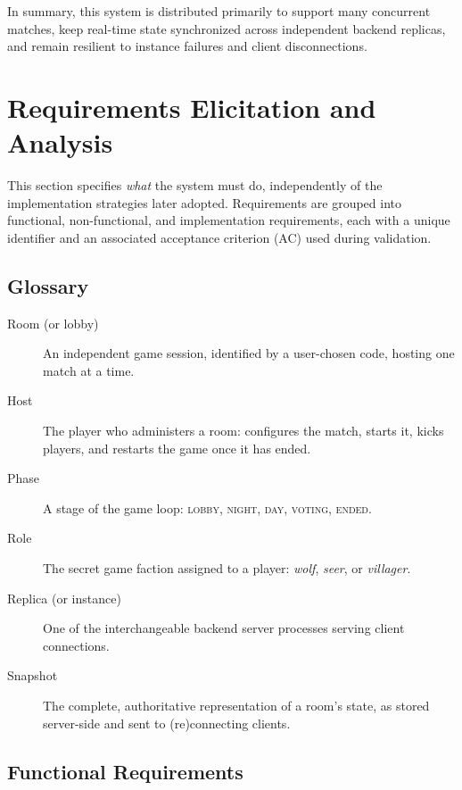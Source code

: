 \documentclass{scrartcl}
\begin{document}
In summary, this system is distributed primarily to support many concurrent
matches, keep real-time state synchronized across independent backend replicas,
and remain resilient to instance failures and client disconnections.

\section{Requirements Elicitation and Analysis}\label{requirements}

This section specifies \emph{what} the system must do, independently of the
implementation strategies later adopted. Requirements are grouped into
functional, non-functional, and implementation requirements, each with a unique
identifier and an associated acceptance criterion (AC) used during validation.

\subsection{Glossary}\label{glossary}

\begin{description}
      \item[Room (or lobby)] An independent game session, identified by a
            user-chosen code, hosting one match at a time.
      \item[Host] The player who administers a room: configures the match, starts
            it, kicks players, and restarts the game once it has ended.
      \item[Phase] A stage of the game loop: \textsc{lobby}, \textsc{night},
            \textsc{day}, \textsc{voting}, \textsc{ended}.
      \item[Role] The secret game faction assigned to a player: \emph{wolf},
            \emph{seer}, or \emph{villager}.
      \item[Replica (or instance)] One of the interchangeable backend server
            processes serving client connections.
      \item[Snapshot] The complete, authoritative representation of a room's state,
            as stored server-side and sent to (re)connecting clients.
\end{description}

\subsection{Functional Requirements}\label{functional-requirements}
\end{document}
